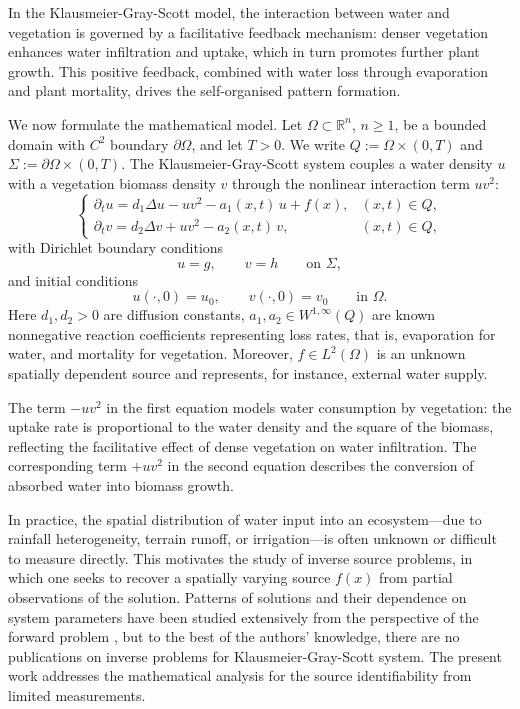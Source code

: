 \documentclass[12pt]{amsart}
\theoremstyle{plain}
\theoremstyle{definition}
\theoremstyle{remark}
\newcommand{\R}{\mathbb{R}}
\newcommand{\p}{\partial}
\newcommand{\Om}{\Omega}
\newcommand{\Dt}{\p_t}
\newcommand{\Lap}{\Delta}
\begin{document}
In the Klausmeier-Gray-Scott model, the interaction between water and vegetation is governed by a facilitative feedback mechanism: denser vegetation enhances water infiltration and uptake, which in turn promotes further plant growth. This positive feedback, combined with water loss through evaporation and plant mortality, drives the self-organised pattern formation.

We now formulate the mathematical model. Let $\Om\subset\R^n$, $n\ge 1$, be a bounded domain with $C^2$ boundary $\p\Om$, and let $T>0$. We write $Q:=\Om\times(0,T)$ and $\Sigma:=\p\Om\times(0,T)$. The Klausmeier-Gray-Scott system couples a water density $u$ with a vegetation biomass density $v$ through the nonlinear interaction term $uv^2$:
\begin{equation}\label{eq:forward}
\begin{cases}
\Dt u = d_1 \Lap u - u v^2 - a_1(x,t)\,u + f(x), & (x,t)\in Q,\\[4pt]
\Dt v = d_2 \Lap v + u v^2 - a_2(x,t)\,v, & (x,t)\in Q,
\end{cases}
\end{equation}
with Dirichlet boundary conditions
\begin{equation}\label{eq:bc}
u=g,\qquad v=h\qquad\text{on }\Sigma,
\end{equation}
and initial conditions
\begin{equation}\label{eq:ic}
u(\cdot,0)=u_0,\qquad v(\cdot,0)=v_0\qquad\text{in }\Om.
\end{equation}
Here $d_1,d_2>0$ are diffusion constants,
$a_1,a_2\in W^{1,\infty}(Q)$ are known nonnegative reaction coefficients 
representing loss rates, that is, evaporation for water, and mortality for 
vegetation. 
Moreover, $f\in L^2(\Om)$ is an unknown spatially dependent source and 
represents, for instance, external water supply.

The term $-uv^2$ in the first equation models water consumption by vegetation:
the uptake rate is proportional to the water density and the square of the
biomass, reflecting the facilitative effect of dense vegetation on water
infiltration.
The corresponding term $+uv^2$ in the second equation describes the conversion
of absorbed water into biomass growth.

In practice, the spatial distribution of water input into an ecosystem---due to
rainfall heterogeneity, terrain runoff, or irrigation---is often unknown or
difficult to measure directly.
This motivates the study of inverse source problems, in which one seeks to recover a spatially varying source $f(x)$ 
from partial observations of the solution.
Patterns of solutions and their dependence on system parameters have been 
studied extensively from the perspective of the forward problem
\cite{consolo2019secondary, sherratt2010pattern, ursino2007modeling}, but 
to the best of the authors' knowledge, there are no publications on 
inverse problems for Klausmeier-Gray-Scott system.
The present work addresses the mathematical analysis for the source
identifiability from limited measurements.
\end{document}
